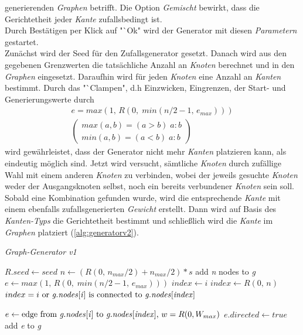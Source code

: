 \documentclass[12pt]{article}
\begin{document}
generierenden \textit{Graphen} betrifft. Die Option \textit{Gemischt} bewirkt, dass die Gerichtetheit jeder \textit{Kante} zufallsbedingt ist.
\\
Durch Bestätigen per Klick auf "`Ok" wird der Generator mit diesen \textit{Parametern} gestartet.
\\
Zunächst wird der Seed für den Zufallsgenerator gesetzt. Danach wird aus den gegebenen Grenzwerten die tatsächliche Anzahl an \textit{Knoten} berechnet und in den \textit{Graphen} eingesetzt. Daraufhin wird für jeden 
\textit{Knoten} eine Anzahl an \textit{Kanten} bestimmt. Durch das "`Clampen", d.h Einzwicken, Eingrenzen, der Start- und 
Generierungswerte durch
\vspace{-20pt}
\begin{gather*}
e = max(1,\,R(0,\;min(n/2-1,\,e_{max}))) \\
\left(\begin{aligned}
max(a, b) = (a > b)\;a : b\\
min(a, b) = (a < b)\;a : b
\end{aligned}
\right)
\end{gather*}
wird gewährleistet, dass der Generator nicht mehr \textit{Kanten} platzieren kann, als eindeutig möglich sind. Jetzt wird versucht, sämtliche \textit{Knoten} durch zufällige Wahl mit einem anderen 
\textit{Knoten} zu verbinden, wobei der jeweils gesuchte \textit{Knoten} weder der Ausgangsknoten selbst, noch ein bereits verbundener \textit{Knoten} sein soll. Sobald eine Kombination gefunden wurde, 
wird die entsprechende \textit{Kante} mit einem ebenfalls zufallsgenerierten \textit{Gewicht} erstellt. Dann wird auf Basis des \textit{Kanten-Typs} die Gerichtetheit bestimmt und schließlich wird die 
\textit{Kante} im \textit{Graphen} platziert (\autoref{alg:generatorv2}).
\begin{algorithm}
\caption{\textit{Graph-Generator v1} \label{alg:generator}}
\begin{algorithmic}[1]
\Statex
{}
\Statex
{}
	\State $R.seed \gets seed$
	\State $n \gets (R(0,\,n_{max}/2) + n_{max}/2) * s$
	\State add \textit{n} nodes to \textit{g}
		\State $e \gets max(1,\,R(0,\;min(n/2-1,\,e_{max})))$
			\State $index \gets i$
			\Repeat 
				\State $index \gets R(0,\,n)$
			\Until $index = i \text{ or \textit{g.nodes}[\textit{i}] is connected to \textit{g.nodes}[\textit{index}]}$
			
			\State $e \gets \text{edge from \textit{g.nodes}[\textit{i}] to \textit{g.nodes}[\textit{index}], } w = R(0, W_{max})$
				\State $e.directed \gets true$
			\EndIf
			\State add \textit{e} to \textit{g}
		\EndFor
	\EndFor
\EndProcedure

\end{algorithmic}
\end{algorithm}
\end{document}
